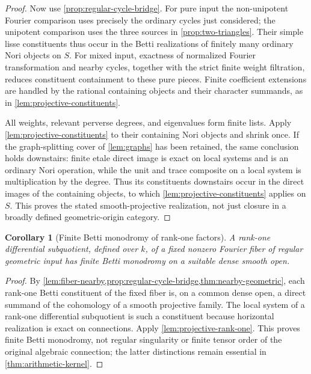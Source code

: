\documentclass[11pt]{article}
\numberwithin{equation}{section}
\newtheorem{corollary}[corollary]{Corollary}
\theoremstyle{definition}
\theoremstyle{remark}
\begin{document}
\begin{proof}
Now use \cref{prop:regular-cycle-bridge}. For pure input the
non-unipotent Fourier comparison uses precisely the ordinary cycles
just considered; the unipotent comparison uses the three sources in
\cref{prop:two-triangles}. Their simple lisse constituents thus occur
in the Betti realizations of finitely many ordinary Nori objects on
$S$. For mixed input, exactness of normalized Fourier transformation
and nearby cycles, together with the strict finite weight filtration,
reduces constituent containment to these pure pieces. Finite coefficient
extensions are handled by the rational containing objects and their
character summands, as in \cref{lem:projective-constituents}.

All weights, relevant perverse degrees, and eigenvalues form finite
lists. Apply \cref{lem:projective-constituents} to their containing
Nori objects and shrink once. If the graph-splitting cover of
\cref{lem:graphs} has been retained, the same conclusion holds downstairs:
finite etale direct image is exact on local systems and is an ordinary
Nori operation, while the unit and trace composite on a local system
is multiplication by the degree. Thus its constituents downstairs
occur in the direct images of the containing objects, to which
\cref{lem:projective-constituents} applies on $S$. This proves the
stated smooth-projective realization, not just closure in a broadly
defined geometric-origin category.
\end{proof}

\begin{corollary}[Finite Betti monodromy of rank-one factors]\label{thm:finite-betti}\label{cor:rankone-finite}
A rank-one differential subquotient, defined over $k$, of a fixed nonzero
Fourier fiber of regular geometric input has finite Betti monodromy on a
suitable dense smooth open.
\end{corollary}
\begin{proof}
By \cref{lem:fiber-nearby,prop:regular-cycle-bridge,thm:nearby-geometric},
each rank-one Betti constituent of the fixed fiber is, on a common dense
open, a direct summand of the cohomology of a smooth projective family.
The local system of a rank-one differential subquotient is such a
constituent because horizontal realization is exact on connections.
Apply \cref{lem:projective-rank-one}. This proves finite Betti monodromy,
not regular singularity or finite tensor order of the original algebraic
connection; the latter distinctions remain essential in
\cref{thm:arithmetic-kernel}.
\end{proof}
\end{document}
